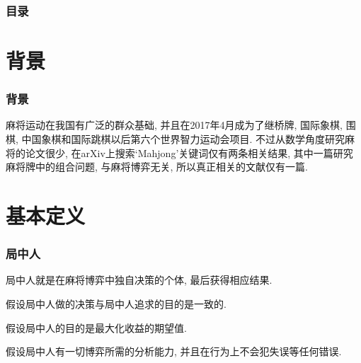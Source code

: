 \documentclass{ctexbeamer}
\title{\TITLE}
\author{\AUTHOR}
\date{\today}
\institute{\INSTITUTE}
\begin{document}

    \begin{frame}
        \titlepage
	\end{frame}
	
	
	\begin{frame}
		\frametitle{目录}
		\tableofcontents[pausesections]
	\end{frame}

	
	\section{背景}

	\begin{frame}
		\frametitle{背景}
		麻将运动在我国有广泛的群众基础, 并且在2017年4月成为了继桥牌,
		国际象棋, 围棋, 中国象棋和国际跳棋以后第六个世界智力运动会项目.
		不过从数学角度研究麻将的论文很少,
		在arXiv上搜索`Mahjong'关键词仅有两条相关结果,
		其中一篇研究麻将牌中的组合问题, 与麻将博弈无关, 所以真正相关的文献仅有一篇.
	\end{frame}

	\section{基本定义}

	\begin{frame}
		\frametitle{局中人}
		\begin{definition}[局中人]
			局中人就是在麻将博弈中独自决策的个体, 最后获得相应结果.
		\end{definition}
		
		\begin{note}
			假设局中人做的决策与局中人追求的目的是一致的.
		\end{note}

		\begin{note}
			假设局中人的目的是最大化收益的期望值.
		\end{note}

		\begin{note}[完全理性假设]
			假设局中人有一切博弈所需的分析能力, 并且在行为上不会犯失误等任何错误.
		\end{note}

	\end{frame}
\end{document}
